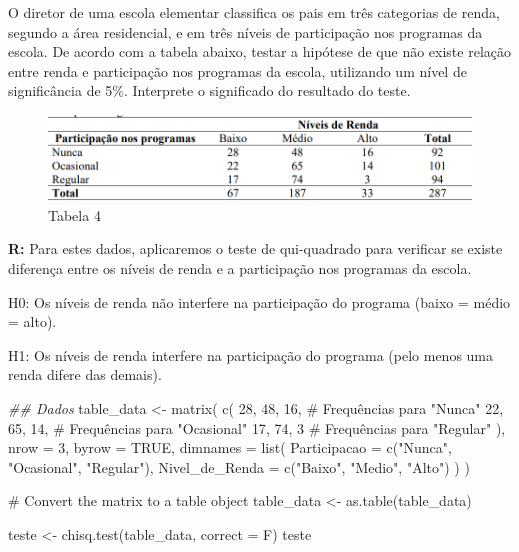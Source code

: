 \documentclass[
  letterpaper,
  DIV=11,
  numbers=noendperiod]{scrartcl}
\newenvironment{Shaded}{\begin{snugshade}}{\end{snugshade}}
\newcommand{\AttributeTok}[1]{\textcolor[rgb]{0.40,0.45,0.13}{#1}}
\newcommand{\CommentTok}[1]{\textcolor[rgb]{0.37,0.37,0.37}{#1}}
\newcommand{\ConstantTok}[1]{\textcolor[rgb]{0.56,0.35,0.01}{#1}}
\newcommand{\DecValTok}[1]{\textcolor[rgb]{0.68,0.00,0.00}{#1}}
\newcommand{\DocumentationTok}[1]{\textcolor[rgb]{0.37,0.37,0.37}{\textit{#1}}}
\newcommand{\FunctionTok}[1]{\textcolor[rgb]{0.28,0.35,0.67}{#1}}
\newcommand{\NormalTok}[1]{\textcolor[rgb]{0.00,0.23,0.31}{#1}}
\newcommand{\OtherTok}[1]{\textcolor[rgb]{0.00,0.23,0.31}{#1}}
\newcommand{\StringTok}[1]{\textcolor[rgb]{0.13,0.47,0.30}{#1}}
\begin{document}
O diretor de uma escola elementar classifica os pais em três categorias
de renda, segundo a área residencial, e em três níveis de participação
nos programas da escola. De acordo com a tabela abaixo, testar a
hipótese de que não existe relação entre renda e participação nos
programas da escola, utilizando um nível de significância de 5\%.
Interprete o significado do resultado do teste.

\begin{figure}[H]

{\centering \includegraphics{imgs/q4-tabela.png}

}

\caption{Tabela 4}

\end{figure}%

\textbf{R:} Para estes dados, aplicaremos o teste de qui-quadrado para
verificar se existe diferença entre os níveis de renda e a participação
nos programas da escola.

H0: Os níveis de renda não interfere na participação do programa (baixo
= médio = alto).

H1: Os níveis de renda interfere na participação do programa (pelo menos
uma renda difere das demais).

\begin{Shaded}
\begin{Highlighting}[]
\DocumentationTok{\#\# Dados}
\NormalTok{table\_data }\OtherTok{\textless{}{-}} \FunctionTok{matrix}\NormalTok{(}
  \FunctionTok{c}\NormalTok{(}
    \DecValTok{28}\NormalTok{, }\DecValTok{48}\NormalTok{, }\DecValTok{16}\NormalTok{,  }\CommentTok{\# Frequências para "Nunca"}
    \DecValTok{22}\NormalTok{, }\DecValTok{65}\NormalTok{, }\DecValTok{14}\NormalTok{,  }\CommentTok{\# Frequências para "Ocasional"}
    \DecValTok{17}\NormalTok{, }\DecValTok{74}\NormalTok{, }\DecValTok{3}    \CommentTok{\# Frequências para "Regular"}
\NormalTok{  ),}
  \AttributeTok{nrow =} \DecValTok{3}\NormalTok{, }\AttributeTok{byrow =} \ConstantTok{TRUE}\NormalTok{,}
  \AttributeTok{dimnames =} \FunctionTok{list}\NormalTok{(}
    \AttributeTok{Participacao =} \FunctionTok{c}\NormalTok{(}\StringTok{"Nunca"}\NormalTok{, }\StringTok{"Ocasional"}\NormalTok{, }\StringTok{"Regular"}\NormalTok{),}
    \AttributeTok{Nivel\_de\_Renda =} \FunctionTok{c}\NormalTok{(}\StringTok{"Baixo"}\NormalTok{, }\StringTok{"Medio"}\NormalTok{, }\StringTok{"Alto"}\NormalTok{)}
\NormalTok{  )}
\NormalTok{)}

\CommentTok{\# Convert the matrix to a table object}
\NormalTok{table\_data }\OtherTok{\textless{}{-}} \FunctionTok{as.table}\NormalTok{(table\_data)}

\NormalTok{teste }\OtherTok{\textless{}{-}} \FunctionTok{chisq.test}\NormalTok{(table\_data, }\AttributeTok{correct =}\NormalTok{ F)}
\NormalTok{teste}
\end{Highlighting}
\end{Shaded}
\end{document}
